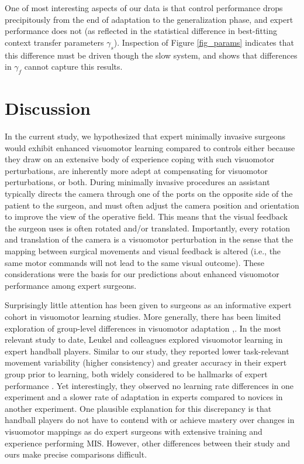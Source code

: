 \documentclass[man, 11pt, longtable, floatsintext, notab]{apa6}
\begin{document}
One of most interesting aspects of our data is that control
performance drops precipitously from the end of adaptation
to the generalization phase, and expert performance does not
(as reflected in the statistical difference in best-fitting
context transfer parameters $\gamma_s$). Inspection of
Figure \ref{fig_params} indicates that this difference must
be driven though the slow system, and shows that differences
in $\gamma_f$ cannot capture this results.

\section{Discussion}
In the current study, we hypothesized that expert minimally
invasive surgeons would exhibit enhanced visuomotor learning
compared to controls either because they draw on an
extensive body of experience coping with such visuomotor
perturbations, are inherently more adept at compensating for
visuomotor perturbations, or both. During minimally invasive
procedures an assistant typically directs the camera through
one of the ports on the opposite side of the patient to the
surgeon, and must often adjust the camera position and
orientation to improve the view of the operative field. This
means that the visual feedback the surgeon uses is often
rotated and/or translated. Importantly, every rotation and
translation of the camera is a visuomotor perturbation in
the sense that the mapping between surgical movements and
visual feedback is altered (i.e., the same motor commands
will not lead to the same visual outcome). These
considerations were the basis for our predictions about
enhanced visuomotor performance among expert surgeons.

Surprisingly little attention has been given to surgeons as
an informative expert cohort in visuomotor learning studies.
More generally, there has been limited exploration of
group-level differences in visuomotor adaptation
\cite{leukel_experts_2015},\cite{kast_motor_2016}. In the
most relevant study to date, Leukel and colleagues
\cite{leukel_experts_2015} explored visuomotor learning in
expert handball players. Similar to our study, they reported
lower task-relevant movement variability (higher
consistency) and greater accuracy in their expert group
prior to learning, both widely considered to be hallmarks of
expert performance
\cite{willingham_neuropsychological_1998}. Yet
interestingly, they observed no learning rate differences in
one experiment and a slower rate of adaptation in experts
compared to novices in another experiment. One plausible
explanation for this discrepancy is that handball players do
not have to contend with or achieve mastery over changes in
visuomotor mappings as do expert surgeons with extensive
training and experience performing MIS. However, other
differences between their study and ours make precise
comparisons difficult.
\end{document}
